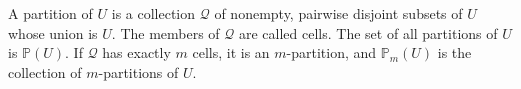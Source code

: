 A partition of $U$ is a collection $\mathcal{Q}$ of nonempty, pairwise disjoint subsets of $U$ whose union is $U$. The members of $\mathcal{Q}$ are called cells. The set of all partitions of $U$ is $\mathbb{P}(U)$. If $\mathcal{Q}$ has exactly $m$ cells, it is an $m$-partition, and $\mathbb{P}_m(U)$ is the collection of $m$-partitions of $U$.
